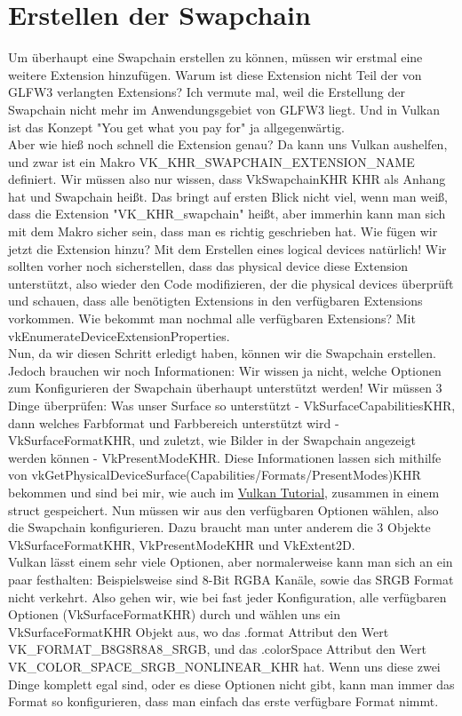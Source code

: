 \documentclass[11pt,a4paper]{report}
\begin{document}
\section{Erstellen der Swapchain}
Um überhaupt eine Swapchain erstellen zu können, müssen wir erstmal eine weitere Extension hinzufügen. Warum ist diese Extension nicht Teil der von GLFW3 verlangten Extensions? Ich vermute mal, weil die Erstellung der Swapchain nicht mehr im Anwendungsgebiet von GLFW3 liegt. Und in Vulkan ist das Konzept "You get what you pay for" ja allgegenwärtig.\\
Aber wie hieß noch schnell die Extension genau? Da kann uns Vulkan aushelfen, und zwar ist ein Makro VK\_KHR\_SWAPCHAIN\_EXTENSION\_NAME definiert. Wir müssen also nur wissen, dass VkSwapchainKHR KHR als Anhang hat und Swapchain heißt. Das bringt auf ersten Blick nicht viel, wenn man weiß, dass die Extension "VK\_KHR\_swapchain" heißt, aber immerhin kann man sich mit dem Makro sicher sein, dass man es richtig geschrieben hat. Wie fügen wir jetzt die Extension hinzu? Mit dem Erstellen eines logical devices natürlich! Wir sollten vorher noch sicherstellen, dass das physical device diese Extension unterstützt, also wieder den Code modifizieren, der die physical devices überprüft und schauen, dass alle benötigten Extensions in den verfügbaren Extensions vorkommen. Wie bekommt man nochmal alle verfügbaren Extensions? Mit vkEnumerateDeviceExtensionProperties.\\
Nun, da wir diesen Schritt erledigt haben, können wir die Swapchain erstellen. Jedoch brauchen wir noch Informationen: Wir wissen ja nicht, welche Optionen zum Konfigurieren der Swapchain überhaupt unterstützt werden! Wir müssen 3 Dinge überprüfen: Was unser Surface so unterstützt - VkSurfaceCapabilitiesKHR, dann welches Farbformat und Farbbereich unterstützt wird - VkSurfaceFormatKHR, und zuletzt, wie Bilder in der Swapchain angezeigt werden können - VkPresentModeKHR. Diese Informationen lassen sich mithilfe von vkGetPhysicalDeviceSurface(Capabilities/Formats/PresentModes)KHR bekommen und sind bei mir, wie auch im \href{https://vulkan-tutorial.com}{Vulkan Tutorial}, zusammen in einem struct gespeichert. Nun müssen wir aus den verfügbaren Optionen wählen, also die Swapchain konfigurieren. Dazu braucht man unter anderem die 3 Objekte VkSurfaceFormatKHR, VkPresentModeKHR und VkExtent2D.\\
Vulkan lässt einem sehr viele Optionen, aber normalerweise kann man sich an ein paar festhalten: Beispielsweise sind 8-Bit RGBA Kanäle, sowie das SRGB Format nicht verkehrt. Also gehen wir, wie bei fast jeder Konfiguration, alle verfügbaren Optionen (VkSurfaceFormatKHR) durch und wählen uns ein VkSurfaceFormatKHR Objekt aus, wo das .format Attribut den Wert VK\_FORMAT\_B8G8R8A8\_SRGB, und das .colorSpace Attribut den Wert VK\_COLOR\_SPACE\_SRGB\_NONLINEAR\_KHR hat. Wenn uns diese zwei Dinge komplett egal sind, oder es diese Optionen nicht gibt, kann man immer das Format so konfigurieren, dass man einfach das erste verfügbare Format nimmt.\\
\end{document}
